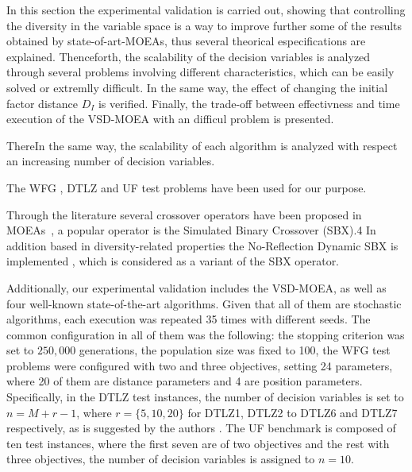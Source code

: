 \begin{figure}[t]
\centering

\label{fig:Diversity}
\end{figure}


In this section the experimental validation is carried out, showing that controlling the diversity in the variable space is a way to improve further some of the results obtained by state-of-art-MOEAs, thus several theorical especifications are explained.
%
Thenceforth, the scalability of the decision variables is analyzed through several problems involving different characteristics, which can be easily solved or extremlly difficult.
%
In the same way, the effect of changing the initial factor distance $D_I$ is verified.
%
Finally, the trade-off between effectivness and time execution of the VSD-MOEA with an difficul problem is presented.

%
ThereIn the same way, the scalability of each algorithm is analyzed with respect an increasing number of decision variables.

%
The WFG \cite{Joel:WFG}, DTLZ \cite{Joel:DTLZ}  and UF \cite{Joel:CEC2009}  test problems have been used for our purpose. 
%

Through the literature several crossover operators have been proposed in MOEAs~\cite{Joel:ParentMeanCentricSelfAdaptation},  
a popular operator is the Simulated Binary Crossover (SBX).4\cite{Joel:SBX1994}%
%	
In addition based in diversity-related properties the No-Reflection Dynamic SBX is implemented \cite{Joel:DNR_SBX}, which is considered as a variant of the SBX operator.


%
Additionally, our experimental validation includes the VSD-MOEA, as well as four well-known state-of-the-art algorithms.
%
Given that all of them are stochastic algorithms, each execution was repeated 35 times with different seeds.
%
The common configuration in all of them was the following: the stopping criterion was set to $250,000$ generations, the population size was fixed to 100, the WFG test problems were configured with two and three objectives, setting 24 parameters, where 20 of them are distance parameters and 4 are position parameters.
%
Specifically, in the DTLZ test instances, the number of decision variables is set to $n=M+r-1$, where $r=\{5, 10, 20\}$ for DTLZ1, DTLZ2 to DTLZ6 and DTLZ7 respectively, as is suggested by the authors \cite{Joel:DTLZ}.  
% 
The UF benchmark is composed of ten test instances, where the first seven are of two objectives and the rest with three objectives, the number of decision variables is assigned to $n=10$.

